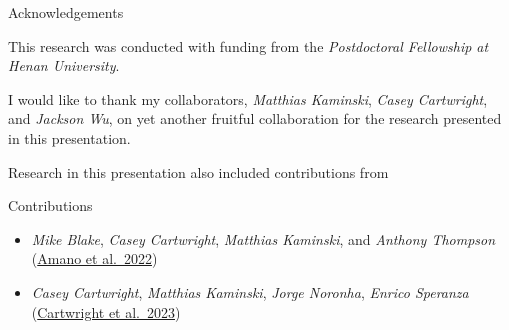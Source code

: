 \documentclass[aspectratio=169, xcolor=dvipsnames]{beamer}
\begin{document}
\begin{frame}{Acknowledgements}

  This research was conducted with funding from the \emph{Postdoctoral
  Fellowship at Henan University}.

  \vfill 

  I would like to thank my collaborators, \emph{Matthias Kaminski}, \emph{Casey
  Cartwright}, and \emph{Jackson Wu}, on yet another fruitful collaboration for
  the research presented in this presentation.

  \vfill 

  Research in this presentation also included contributions from

  \begin{block}{Contributions}
    {\small
    \begin{itemize}
      \item
        \emph{Mike Blake}, \emph{Casey Cartwright}, \emph{Matthias Kaminski},
        and \emph{Anthony Thompson}\\
        (\href{https://inspirehep.net/literature/2174613}{Amano et al.~2022})
      \item
        \emph{Casey Cartwright}, \emph{Matthias Kaminski}, \emph{Jorge
        Noronha}, \emph{Enrico Speranza}\\
        (\href{https://inspirehep.net/literature/1994753}{Cartwright et al.~2023})
    \end{itemize}
  }
  \end{block}

\end{frame}



\end{document}
